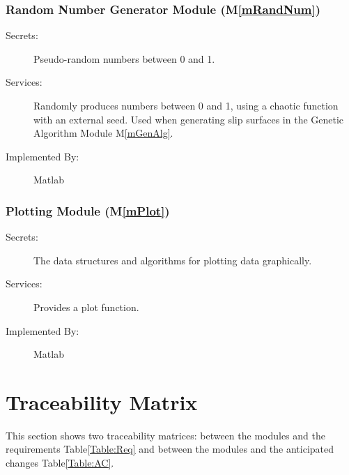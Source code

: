 \documentclass[12pt]{article}
\newcommand{\mref}[1]{M\ref{#1}}
\newcommand{\tableref}[1]{Table\ref{#1}}
\begin{document}
\subsubsection{Random Number Generator Module (\mref{mRandNum})}

\begin{description}
\item[Secrets:] Pseudo-random numbers between 0 and 1.
\item[Services:] Randomly produces numbers between 0 and 1, using a
  chaotic function with an external seed. Used when generating slip
  surfaces in the Genetic Algorithm Module \mref{mGenAlg}.
\item[Implemented By:] Matlab
\end{description}


\subsubsection{Plotting Module (\mref{mPlot})}

\begin{description}
\item[Secrets:] The data structures and algorithms for plotting data
  graphically.
\item[Services:] Provides a plot function.
\item[Implemented By:] Matlab
\end{description}

\section{Traceability Matrix} \label{SecTM}

\hspace{3ex}This section shows two traceability matrices: between the
modules and the requirements \tableref{Table:Req} and between the
modules and the anticipated changes \tableref{Table:AC}.
\end{document}
